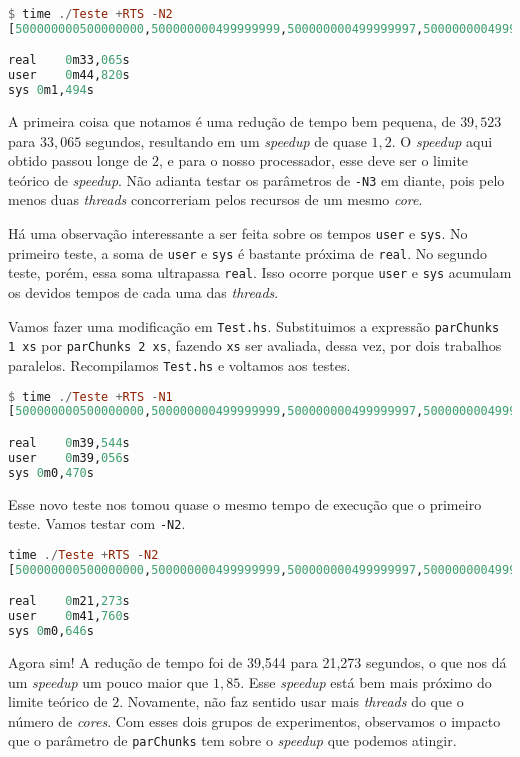 \documentclass[a4paper]{article}
\begin{document}
\begin{lstlisting}[language=haskell, frame=single]
$ time ./Teste +RTS -N2
[500000000500000000,500000000499999999,500000000499999997,500000000499999994]

real	0m33,065s
user	0m44,820s
sys	0m1,494s
\end{lstlisting}

A primeira coisa que notamos é uma redução de tempo bem pequena, de $39,523$ para $33,065$ segundos, resultando em um \emph{speedup} de quase $1,2$.
O \emph{speedup} aqui obtido passou longe de $2$, e para o nosso processador, esse deve ser o limite teórico de \emph{speedup}.
Não adianta testar os parâmetros de \texttt{-N3} em diante, pois pelo menos duas \emph{threads} concorreriam pelos recursos de um mesmo \emph{core}.

Há uma observação interessante a ser feita sobre os tempos \texttt{user} e \texttt{sys}.
No primeiro teste, a soma de \texttt{user} e \texttt{sys} é bastante próxima de \texttt{real}.
No segundo teste, porém, essa soma ultrapassa \texttt{real}.
Isso ocorre porque \texttt{user} e \texttt{sys} acumulam os devidos tempos de cada uma das \emph{threads}.

Vamos fazer uma modificação em \texttt{Test.hs}.
Substituimos a expressão \texttt{parChunks 1 xs} por \texttt{parChunks 2 xs}, fazendo \texttt{xs} ser avaliada, dessa vez, por dois trabalhos paralelos.
Recompilamos \texttt{Test.hs} e voltamos aos testes.

\begin{lstlisting}[language=haskell, frame=single]
$ time ./Teste +RTS -N1
[500000000500000000,500000000499999999,500000000499999997,500000000499999994]

real	0m39,544s
user	0m39,056s
sys	0m0,470s
\end{lstlisting}

Esse novo teste nos tomou quase o mesmo tempo de execução que o primeiro teste.
Vamos testar com \texttt{-N2}.

\begin{lstlisting}[language=haskell, frame=single]
 time ./Teste +RTS -N2
[500000000500000000,500000000499999999,500000000499999997,500000000499999994]

real	0m21,273s
user	0m41,760s
sys	0m0,646s
\end{lstlisting}

Agora sim!
A redução de tempo foi de 39,544 para 21,273 segundos, o que nos dá um \emph{speedup} um pouco maior que $1,85$.
Esse \emph{speedup} está bem mais próximo do limite teórico de $2$.
Novamente, não faz sentido usar mais \emph{threads} do que o número de \emph{cores}.
Com esses dois grupos de experimentos, observamos o impacto que o parâmetro de \texttt{parChunks} tem sobre o \emph{speedup} que podemos atingir.
\end{document}
